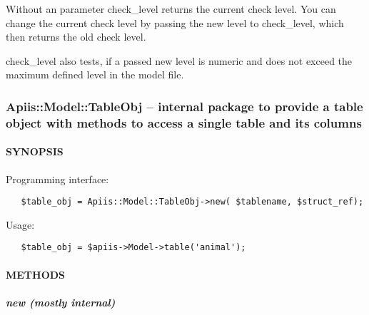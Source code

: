 Without an parameter check\_level returns the current check level. You can
change the current check level by passing the new level to check\_level,
which then returns the old check level.



check\_level also tests, if a passed new level is numeric and does not
exceed the maximum defined level in the model file.

\subsubsection*{Apiis::Model::TableObj -- internal package to provide a table object with
methods to access a single table and its columns\label{Apiis::Model_--_methods_to_access_the_model_file_data_via_the_apiis_structure_Apiis::Model::TableObj_--_internal_package_to_provide_a_table_object_with_methods_to_access_a_single_table_and_its_columns}}




\paragraph*{SYNOPSIS\label{Apiis::Model::TableObj_--_internal_package_to_provide_a_table_object_with_methods_to_access_a_single_table_and_its_columns_SYNOPSIS}}


Programming interface:

\begin{verbatim}
   $table_obj = Apiis::Model::TableObj->new( $tablename, $struct_ref);
\end{verbatim}


Usage:

\begin{verbatim}
   $table_obj = $apiis->Model->table('animal');
\end{verbatim}
\paragraph*{METHODS\label{Apiis::Model::TableObj_--_internal_package_to_provide_a_table_object_with_methods_to_access_a_single_table_and_its_columns_METHODS}}
\subparagraph*{new (mostly internal)\label{Apiis::Model::TableObj_--_internal_package_to_provide_a_table_object_with_methods_to_access_a_single_table_and_its_columns_new_mostly_internal_}}


